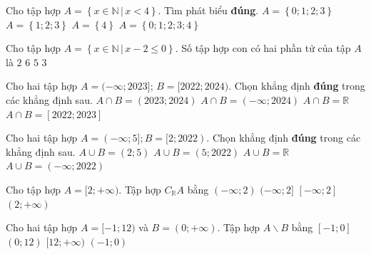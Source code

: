 \begin{ex}%
Cho tập hợp $A=\left\{x \in \mathbb{N}\,|\, x<4\right\}$. Tìm phát biểu \textbf{đúng}.
	\choice
	{\True $A=\left\{0;1;2;3\right\}$}
	{$A=\left\{1;2;3\right\}$}
	{$A=\left\{4\right\}$}
	{$A=\left\{0;1;2;3;4\right\}$}
\end{ex}

\begin{ex}%
	Cho tập hợp $A=\left\{x \in \mathbb{N}\,|\, x-2\leq 0\right\}$. Số tập hợp con có hai phần tử của tập $A$ là
	\choice
	{$2$}
	{$6$}
	{$5$}
	{\True $3$}
\end{ex}

\begin{ex}%
Cho hai tập hợp $A=(-\infty ; 2023]$; $B=[2022 ; 2024)$. Chọn khẳng định \textbf{đúng} trong các khẳng định sau.
\choice
{$A \cap B=(2023 ; 2024)$}
{$A \cap B=(-\infty ; 2024)$}
{$A \cap B=\mathbb{R}$}
{\True $A \cap B=[2022 ; 2023]$}
\end{ex}

\begin{ex}%
Cho hai tập hợp $A=(-\infty ; 5] ; B=[2 ; 2022)$. Chọn khẳng định \textbf{đúng} trong các khẳng định sau.
\choice
{$A \cup B=(2 ; 5)$}
 {$A \cup B=(5 ; 2022)$}
{$A \cup B=\mathbb{R}$}
{$A \cup B=(-\infty ; 2022)$}
\end{ex}

\begin{ex}%
Cho tập hợp $A=[2 ;+\infty)$. Tập hợp $C_{\mathbb{R}} A$ bằng
	\choice
{\True $(-\infty ; 2)$}
{$(-\infty ; 2]$}
{$[-\infty ; 2]$}
{$(2 ;+\infty)$}
\end{ex}

\begin{ex}%
Cho hai tập hợp $A=[-1 ; 12)$ và $B=(0 ;+\infty)$. Tập hợp $A \backslash B$ bằng
\choice
{\True $[-1 ; 0]$}
{$(0 ; 12)$}
{$[12 ;+\infty)$}
{$(-1 ; 0)$}
\end{ex}

